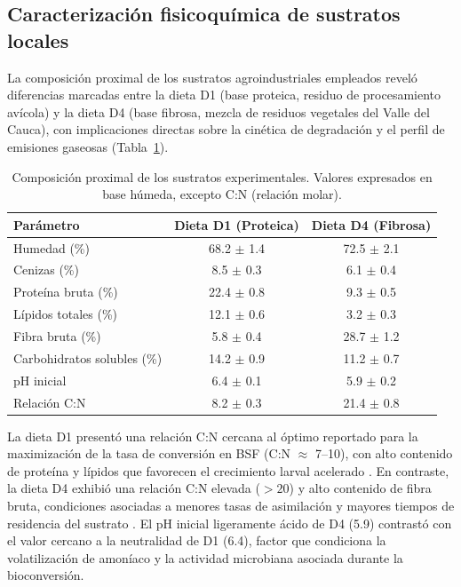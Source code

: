 

\subsection{Caracterización fisicoquímica de sustratos locales}
\label{subsec:cap2_caracterizacion_sustratos}

La composición proximal de los sustratos agroindustriales empleados
reveló diferencias marcadas entre la dieta D1 (base proteica, residuo
de procesamiento avícola) y la dieta D4 (base fibrosa, mezcla de
residuos vegetales del Valle del Cauca), con implicaciones directas
sobre la cinética de degradación y el perfil de emisiones gaseosas
(Tabla~\ref{tab:composicion_sustratos}).

\begin{table}[htbp]
\centering
\caption{Composición proximal de los sustratos experimentales.
Valores expresados en base húmeda, excepto C:N (relación molar).}
\label{tab:composicion_sustratos}
\begin{tabular}{lcc}
\toprule
\textbf{Parámetro} & \textbf{Dieta D1 (Proteica)} & \textbf{Dieta D4 (Fibrosa)} \\
\midrule
Humedad (\%) & 68.2 $\pm$ 1.4 & 72.5 $\pm$ 2.1 \\
Cenizas (\%) & 8.5 $\pm$ 0.3 & 6.1 $\pm$ 0.4 \\
Proteína bruta (\%) & 22.4 $\pm$ 0.8 & 9.3 $\pm$ 0.5 \\
Lípidos totales (\%) & 12.1 $\pm$ 0.6 & 3.2 $\pm$ 0.3 \\
Fibra bruta (\%) & 5.8 $\pm$ 0.4 & 28.7 $\pm$ 1.2 \\
Carbohidratos solubles (\%) & 14.2 $\pm$ 0.9 & 11.2 $\pm$ 0.7 \\
pH inicial & 6.4 $\pm$ 0.1 & 5.9 $\pm$ 0.2 \\
Relación C:N & 8.2 $\pm$ 0.3 & 21.4 $\pm$ 0.8 \\
\bottomrule
\end{tabular}
\end{table}

La dieta D1 presentó una relación C:N cercana al óptimo reportado para
la maximización de la tasa de conversión en BSF (C:N $\approx$ 7--10),
con alto contenido de proteína y lípidos que favorecen el crecimiento
larval acelerado \autocite{nayakHermetiaIllucensDiptera2023}. En
contraste, la dieta D4 exhibió una relación C:N elevada ($>20$) y alto
contenido de fibra bruta, condiciones asociadas a menores tasas de
asimilación y mayores tiempos de residencia del sustrato
\autocite{siddiquiBlackSoldierFly2022}. El pH inicial ligeramente ácido
de D4 (5.9) contrastó con el valor cercano a la neutralidad de D1 (6.4),
factor que condiciona la volatilización de amoníaco y la actividad
microbiana asociada durante la bioconversión.

